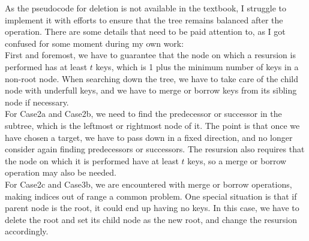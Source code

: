 \documentclass[UTF8]{ctexart}
\begin{document}
As the pseudocode for deletion is not available in the textbook, I struggle to implement it with efforts to ensure that the tree remains balanced after the operation.
There are some details that need to be paid attention to, as I got confused for some moment during my own work:\\
First and foremost, we have to guarantee that the node on which a resursion is performed has at least $t$ keys, which is 1 plus the minimum number of keys in a non-root node.
When searching down the tree, we have to take care of the child node with underfull keys, and we have to merge or borrow keys from its sibling node if necessary.\\
For Case2a and Case2b, we need to find the predecessor or successor in the subtree, which is the leftmost or rightmost node of it.
The point is that once we have chosen a target, we have to pass down in a fixed direction, and no longer consider again finding predecessors or successors.
The resursion also requires that the node on which it is performed have at least $t$ keys, so a merge or borrow operation may also be needed.\\
For Case2c and Case3b, we are encountered with merge or borrow operations, making indices out of range a common problem. One special situation is that if parent node is the root, it could end up having no keys.
In this case, we have to delete the root and set its child node as the new root, and change the resursion accordingly.\\
\end{document}
